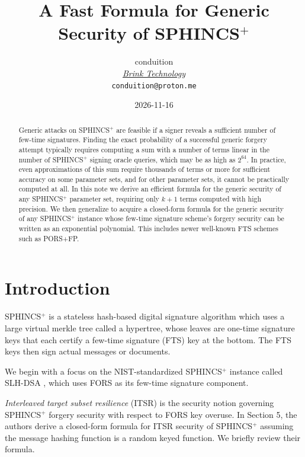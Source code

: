 \documentclass[11pt]{article}
\title{A Fast Formula for Generic Security of SPHINCS$^+$}
\author{conduition \\ \href{https://brink.dev}{\emph{Brink Technology}} \\ \small \texttt{conduition@proton.me}}
\date{2026-11-16}
\newcommand{\spx}{SPHINCS$^+$\xspace}
\begin{document}
\maketitle

\begin{abstract}
Generic attacks on SPHINCS$^+$ are feasible if a signer reveals a sufficient number of few-time signatures. Finding the exact probability of a successful generic forgery attempt typically requires computing a sum with a number of terms linear in the number of SPHINCS$^+$ signing oracle queries, which may be as high as $2^{64}$. In practice, even approximations of this sum require thousands of terms or more for sufficient accuracy on some parameter sets, and for other parameter sets, it cannot be practically computed at all. In this note we derive an efficient formula for the generic security of any SPHINCS$^+$ parameter set, requiring only $k+1$ terms computed with high precision. We then generalize to acquire a closed-form formula for the generic security of any SPHINCS$^+$ instance whose few-time signature scheme's forgery security can be written as an exponential polynomial. This includes newer well-known FTS schemes such as PORS+FP.
\end{abstract}

{\let\thefootnote\relax {}}

\newpage
\section{Introduction}

\spx \cite{sphincsplus} is a stateless hash-based digital signature algorithm which uses a large virtual merkle tree called a hypertree, whose leaves are one-time signature keys that each certify a few-time signature (FTS) key at the bottom. The FTS keys then sign actual messages or documents.

We begin with a focus on the NIST-standardized \spx instance called SLH-DSA \cite{fips205}, which uses FORS \cite{sphincsplus} as its few-time signature component.

\emph{Interleaved target subset resilience} (ITSR) is the security notion governing \spx forgery security with respect to FORS key overuse. In \cite{sphincsplus} Section 5, the authors derive a closed-form formula for ITSR security of \spx assuming the message hashing function is a random keyed function. We briefly review their formula.
\end{document}
